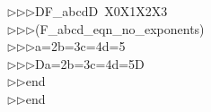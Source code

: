 \begin{tabbing}
$\triangleright$\>$\triangleright$\>$\triangleright$\>DF\_abcdD\ X0X1X2X3\ \\[0pt]
$\triangleright$\>$\triangleright$\>$\triangleright$\>(F\_abcd\_eqn\_no\_exponents)\ \\[0pt]
$\triangleright$\>$\triangleright$\>$\triangleright$\>a=2b=3c=4d=5\ \\[0pt]
$\triangleright$\>$\triangleright$\>$\triangleright$\>Da=2b=3c=4d=5D\ \\[0pt]
$\triangleright$\>$\triangleright$\>end\ \\[0pt]
$\triangleright$\>$\triangleright$\>end\ \\[0pt]
\end{tabbing}
